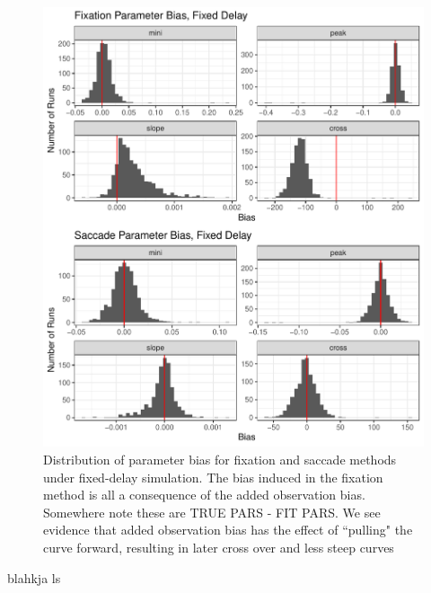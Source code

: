 \documentclass{article}
\begin{document}
\begin{figure}[H]
\centering
\includegraphics{fixed_delay_par_bias.pdf}
\caption{Distribution of parameter bias for fixation and saccade methods under fixed-delay simulation. The bias induced in the fixation method is all a consequence of the added observation bias. Somewhere note these are TRUE PARS - FIT PARS. We see evidence that added observation bias has the effect of ``pulling" the curve forward, resulting in later cross over and less steep curves}
\label{fig:fixed_par_bias}
\end{figure}


blahkja ls 
%
%
%
%
\end{document}
